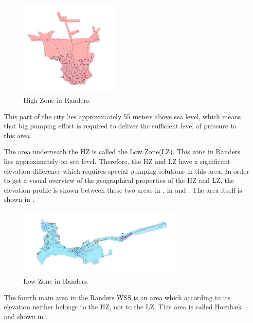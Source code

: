 \begin{figure}[H]
\centering
\includegraphics[width=0.45\textwidth]{report/pictures/Highzone_region}
\caption{High Zone in Randers.}
\label{fig:highzone_region}
\end{figure}

This part of the city lies approximately 55 meters above sea level, which means that big pumping effort is required to deliver the sufficient level of pressure to this area. 

The area underneath the HZ is called the Low Zone(LZ). This zone in Randers lies approximately on sea level. Therefore, the HZ and LZ have a significant elevation difference which requires special pumping solutions in this area. In order to get a visual overview of the geographical properties of the HZ and LZ, the elevation profile is shown between these two areas in , in  and . The area itself is shown in .

\begin{figure}[H]
\centering
\includegraphics[width=0.75\textwidth]{report/pictures/Lowzone_region}
\caption{Low Zone in Randers.}
\label{fig:lowzone_region}
\end{figure}

The fourth main area in the Randers WSS is an area which according to its elevation neither belongs to the HZ, nor to the LZ. This area is called Hornbæk and shown in .

